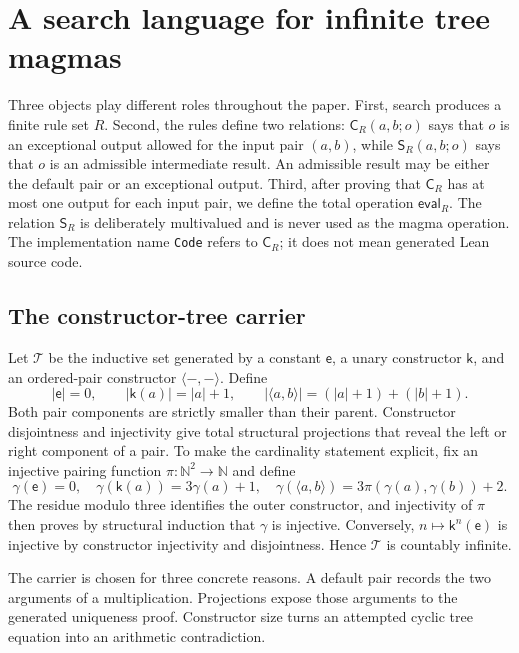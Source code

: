 \documentclass[runningheads]{llncs}
\newcommand{\Tree}{\mathcal{T}}
\newcommand{\Code}{\mathsf{C}}
\newcommand{\Step}{\mathsf{S}}
\newcommand{\evalop}{\mathsf{eval}}
\newcommand{\pair}[2]{\langle #1,#2\rangle}
\begin{document}
\section{A search language for infinite tree magmas}
\label{sec:model-language}

Three objects play different roles throughout the paper.  First, search
produces a finite rule set $R$.  Second, the rules define two relations:
$\Code_R(a,b;o)$ says that $o$ is an exceptional output allowed for the input
pair $(a,b)$, while $\Step_R(a,b;o)$ says that $o$ is an admissible intermediate
result.  An admissible result may be either the default pair or an exceptional
output.  Third, after proving that $\Code_R$ has at most one output for each
input pair, we define the total operation $\evalop_R$.  The relation $\Step_R$
is deliberately multivalued and is never used as the magma operation.  The
implementation name \texttt{Code} refers to $\Code_R$; it does not mean
generated Lean source code.

\subsection{The constructor-tree carrier}

Let $\Tree$ be the inductive set generated by a constant $\mathsf e$, a unary
constructor $\mathsf k$, and an ordered-pair constructor $\pair{-}{-}$.  Define
\[
 |\mathsf e|=0,\qquad |\mathsf k(a)|=|a|+1,\qquad
 |\pair{a}{b}|=(|a|+1)+(|b|+1).
\]
Both pair components are strictly smaller than their parent.  Constructor
disjointness and injectivity give total structural projections that reveal the
left or right component of a pair.  To make the cardinality statement
explicit, fix an injective pairing function
\(\pi:\mathbb N^2\to\mathbb N\) and define
\[
 \gamma(\mathsf e)=0,\quad
 \gamma(\mathsf k(a))=3\gamma(a)+1,\quad
 \gamma(\pair{a}{b})=3\pi(\gamma(a),\gamma(b))+2.
\]
The residue modulo three identifies the outer constructor, and injectivity of
\(\pi\) then proves by structural induction that \(\gamma\) is injective.
Conversely, $n\mapsto\mathsf k^n(\mathsf e)$ is injective by constructor
injectivity and disjointness.  Hence \(\Tree\) is countably infinite.

The carrier is chosen for three concrete reasons.  A default pair records the
two arguments of a multiplication.  Projections expose those arguments to the
generated uniqueness proof.  Constructor size turns an attempted cyclic tree
equation into an arithmetic contradiction.
\end{document}
